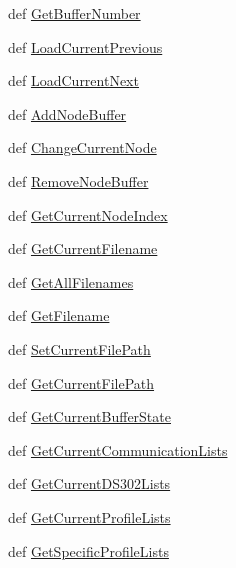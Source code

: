 \begin{CompactItemize}
\item 
def \hyperlink{classnodemanager_1_1NodeManager_7b29a1052a7fa6ee188b166e3177485f}{Get\-Buffer\-Number}
\item 
def \hyperlink{classnodemanager_1_1NodeManager_2f332723fc8da42f3fe9622a3b92356d}{Load\-Current\-Previous}
\item 
def \hyperlink{classnodemanager_1_1NodeManager_9c706ee3cf44203d266c3c40f1145b47}{Load\-Current\-Next}
\item 
def \hyperlink{classnodemanager_1_1NodeManager_eac2e9ec8e243bb88df764e5fb8d3f27}{Add\-Node\-Buffer}
\item 
def \hyperlink{classnodemanager_1_1NodeManager_4ac7001e425a05c907a28218075f175f}{Change\-Current\-Node}
\item 
def \hyperlink{classnodemanager_1_1NodeManager_3ccf1080dcb1e1efc94e5311fcfbf60b}{Remove\-Node\-Buffer}
\item 
def \hyperlink{classnodemanager_1_1NodeManager_ec0793f016391c954ceb4654e4130dc3}{Get\-Current\-Node\-Index}
\item 
def \hyperlink{classnodemanager_1_1NodeManager_1dedfc92859eb980e74ea6544233e6ba}{Get\-Current\-Filename}
\item 
def \hyperlink{classnodemanager_1_1NodeManager_bf87dbbb8a5bbec59ab3b484853e1619}{Get\-All\-Filenames}
\item 
def \hyperlink{classnodemanager_1_1NodeManager_f96ff5a9ac497abf8918a7913c676da8}{Get\-Filename}
\item 
def \hyperlink{classnodemanager_1_1NodeManager_e959c5f835af208968908fe5eeb140a6}{Set\-Current\-File\-Path}
\item 
def \hyperlink{classnodemanager_1_1NodeManager_4426800be5bb5a6d88f3d52e5c9758e8}{Get\-Current\-File\-Path}
\item 
def \hyperlink{classnodemanager_1_1NodeManager_cf7deb7b847cb8a6cd7a3af6b8070097}{Get\-Current\-Buffer\-State}
\item 
def \hyperlink{classnodemanager_1_1NodeManager_74dfed4678ba786356b8d03873d01cec}{Get\-Current\-Communication\-Lists}
\item 
def \hyperlink{classnodemanager_1_1NodeManager_18ce6167b3340d17fc7962323ae344b6}{Get\-Current\-DS302Lists}
\item 
def \hyperlink{classnodemanager_1_1NodeManager_b0da4084ac671ac3c8948c42acc55b8c}{Get\-Current\-Profile\-Lists}
\item 
def \hyperlink{classnodemanager_1_1NodeManager_8f418509e43cc26670ef757c6854328b}{Get\-Specific\-Profile\-Lists}
\item 

\end{CompactItemize}
